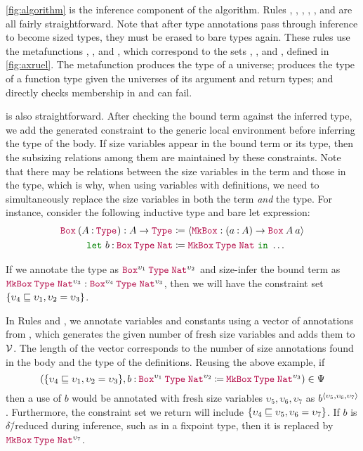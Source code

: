 \autoref{fig:algorithm} is the inference component of the algorithm. Rules , , , , , and  are all fairly straightforward.
Note that after type annotations pass through inference to become sized types, they must be erased to bare types again.
These rules use the metafunctions \axiom, , and \elim, which correspond to the sets \Axioms, \Rules, and \Elims, defined in \autoref{fig:axruel}.
The metafunction \axiom produces the type of a universe;  produces the type of a function type given the universes of its argument and return types; and \elim directly checks membership in \Elims and can fail.

 is also straightforward.
After checking the bound term against the inferred type, we add the generated constraint to the generic local environment before inferring the type of the body.
If size variables appear in the bound term or its type, then the subsizing relations among them are maintained by these constraints.
Note that there may be relations between the size variables in the term and those in the type, which is why, when using variables with definitions, we need to simultaneously replace the size variables in both the term \textit{and} the type.
For instance, consider the following inductive type and bare let expression:
\begin{align*}
  \app{\Box}{(\assm{A}{\Type{}})} : A \to \Type{} &\coloneqq
    \seq{\MkBox : (\assm{a}{A}) \to \app{\Box}{A}{a}} \\
  \letin{b}{\app{\Box}{\Type{}}{\Nat}&}{\app{\MkBox}{\Type{}}{\Nat}}{\dots}
\end{align*}

If we annotate the type as $\app{\Box^{\upsilon_1}}{\Type{}}{\Nat^{\upsilon_2}}$ and size-infer the bound term as $\app{\MkBox}{\Type{}}{\Nat^{\upsilon_3}} : \app{\Box^{\upsilon_4}}{\Type{}}{\Nat^{\upsilon_3}}$, then we will have the constraint set \mbox{$\{\upsilon_4 \sqsubseteq \upsilon_1, \upsilon_2 = \upsilon_3\}$}.

In Rules  and , we annotate variables and constants using a vector of annotations from \fresh, which generates the given number of fresh size variables and adds them to $\mathcal{V}$.
The length of the vector corresponds to the number of size annotations found in the body and the type of the definitions.
Reusing the above example, if
$$(\set{\upsilon_4 \sqsubseteq \upsilon_1, \upsilon_2 = \upsilon_3}, \defn{b}{\app{\Box^{\upsilon_1}}{\Type{}}{\Nat^{\upsilon_2}}}{\app{\MkBox}{\Type{}}{\Nat^{\upsilon_3}}}) \in \Psi$$
then a use of $b$ would be annotated with fresh size variables $\upsilon_5, \upsilon_6, \upsilon_7$ as $b^{\langle\upsilon_5, \upsilon_6, \upsilon_7\rangle}$.
Furthermore, the constraint set we return will include $\{\upsilon_4 \sqsubseteq \upsilon_5, \upsilon_6 = \upsilon_7\}$.
If $b$ is $\delta$\=/reduced during inference, such as in a fixpoint type, then it is replaced by $\app{\MkBox}{\Type{}}{\Nat^{\upsilon_7}}$.

